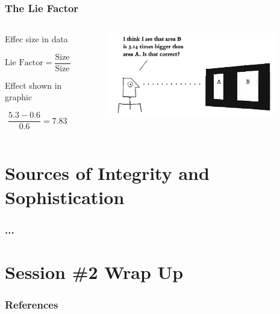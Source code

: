 \documentclass[notes, aspectratio=1610]{beamer}
\begin{document}
\begin{frame}
	\frametitle{The Lie Factor}
	\begin{columns}
		\begin{column}{0.5\textwidth}
			\footnotesize
			Effec size in data

			\begin{equation}
				\text{Lie Factor} = \frac{\text{Size of the effect shown in graphic}}
					                 {\text{Size of effect in data}}
			\end{equation}

			Effect shown in graphic

			\begin{equation}
				\frac{5.3 - 0.6}{0.6} = 7.83
			\end{equation}
		\end{column}
		\begin{column}{0.5\textwidth}
			\begin{figure}
				\begin{small}
					\begin{center}
						\includegraphics[width=0.95\textwidth]{
							images/is_that_correct.png}
					\end{center}
				\end{small}
			\end{figure}
		\end{column}
	\end{columns}
\end{frame}



\section{Sources of Integrity and Sophistication}

\begin{frame}
	\frametitle{...}
\end{frame}

\section{Session \#2 Wrap Up}


\begin{frame}
	\frametitle{References}
	\printbibliography
 \end{frame} 
\end{document}
